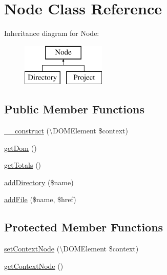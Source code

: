 \hypertarget{class_sebastian_bergmann_1_1_code_coverage_1_1_report_1_1_xml_1_1_node}{}\section{Node Class Reference}
\label{class_sebastian_bergmann_1_1_code_coverage_1_1_report_1_1_xml_1_1_node}
Inheritance diagram for Node\+:\begin{figure}[H]
\begin{center}
\leavevmode
\includegraphics[height=2.000000cm]{class_sebastian_bergmann_1_1_code_coverage_1_1_report_1_1_xml_1_1_node}
\end{center}
\end{figure}
\subsection*{Public Member Functions}
\begin{DoxyCompactItemize}
\item 
\mbox{\hyperlink{class_sebastian_bergmann_1_1_code_coverage_1_1_report_1_1_xml_1_1_node_a3d40077fdf18089a879b71420d43633c}{\+\_\+\+\_\+construct}} (\textbackslash{}D\+O\+M\+Element \$context)
\item 
\mbox{\hyperlink{class_sebastian_bergmann_1_1_code_coverage_1_1_report_1_1_xml_1_1_node_a9339f3153a26b2e0c3a210e2f3e0f9c7}{get\+Dom}} ()
\item 
\mbox{\hyperlink{class_sebastian_bergmann_1_1_code_coverage_1_1_report_1_1_xml_1_1_node_a511f22f1ae170e06402df3b31633061a}{get\+Totals}} ()
\item 
\mbox{\hyperlink{class_sebastian_bergmann_1_1_code_coverage_1_1_report_1_1_xml_1_1_node_a1a418de89a53c74e230f440c3b8dd3a1}{add\+Directory}} (\$name)
\item 
\mbox{\hyperlink{class_sebastian_bergmann_1_1_code_coverage_1_1_report_1_1_xml_1_1_node_a02077e5c73d70880da980a1a4a933381}{add\+File}} (\$name, \$href)
\end{DoxyCompactItemize}
\subsection*{Protected Member Functions}
\begin{DoxyCompactItemize}
\item 
\mbox{\hyperlink{class_sebastian_bergmann_1_1_code_coverage_1_1_report_1_1_xml_1_1_node_adbe3922635f3c23fc931e3c280fe60c2}{set\+Context\+Node}} (\textbackslash{}D\+O\+M\+Element \$context)
\item 
\mbox{\hyperlink{class_sebastian_bergmann_1_1_code_coverage_1_1_report_1_1_xml_1_1_node_a0654c6f0e75ff5b65acc4f62040c650a}{get\+Context\+Node}} ()
\end{DoxyCompactItemize}


